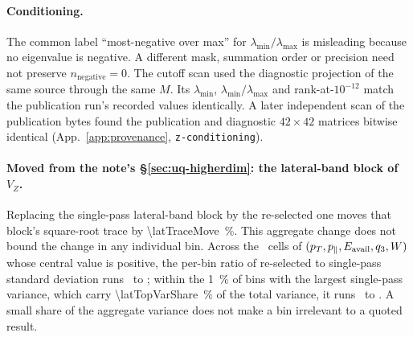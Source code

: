 \paragraph{Conditioning.} The common label ``most-negative over max'' for $\lambda_{\min}/\lambda_{\max}$ is misleading because no eigenvalue is negative. A different mask, summation order or precision need not preserve $n_{\mathrm{negative}}=0$. The cutoff scan used the diagnostic projection of the same source through the same $M$. Its $\lambda_{\min}$, $\lambda_{\min}/\lambda_{\max}$ and rank-at-$10^{-12}$ match the publication run's recorded values identically. A later independent scan of the publication bytes found the publication and diagnostic $42\times42$ matrices bitwise identical (App.~\ref{app:provenance}, \texttt{z-conditioning}).

\paragraph{Moved from the note's \S\ref{sec:uq-higherdim}: the lateral-band block of $V_Z$.} Replacing the single-pass lateral-band block by the re-selected one moves that block's square-root trace by \SI{\latTraceMove}{\percent}. This aggregate change does not bound the change in any individual bin. Across the \latBins\ cells of $(p_{T},p_{\parallel},E_{\mathrm{avail}},q_{3},W)$ whose central value is positive, the per-bin ratio of re-selected to single-pass standard deviation runs \latRatioMin\ to \latRatioMax; within the \SI{1}{\percent} of bins with the largest single-pass variance, which carry \SI{\latTopVarShare}{\percent} of the total variance, it runs \latRatioTopMin\ to \latRatioTopMax. A small share of the aggregate variance does not make a bin irrelevant to a quoted result.

